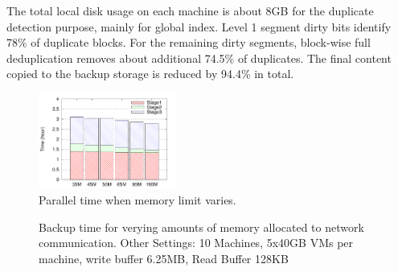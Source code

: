 The total local disk usage on each machine is about 8GB for the duplicate detection purpose,
mainly for global index. 
Level 1 segment dirty bits identify 78\% of duplicate blocks. For the remaining dirty segments,
block-wise full deduplication removes about additional 74.5\% of duplicates.
The final content copied to the backup storage is reduced by 94.4\% in total.

\begin{figure}
\centering
\includegraphics[width=0.4\textwidth]{mem_time.pdf}
\caption{ Parallel time when memory limit varies.}
\label{fig:memory}
\end{figure}

\begin{figure}[ht]
  \centering
  \caption{Backup time for verying amounts of memory allocated to network communication. Other Settings: 10 Machines, 5x40GB VMs per machine, write buffer 6.25MB, Read Buffer 128KB}
  \label{fig:mpibuf-mem}
\end{figure}

